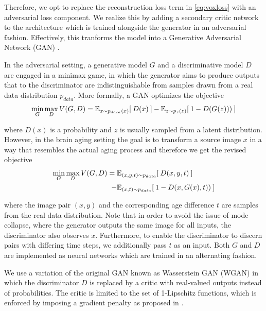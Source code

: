 Therefore, we opt to replace the reconstruction loss term in \autoref{eq:voxloss} with an adversarial loss component. We realize this by adding a secondary critic network to the architecture which is trained alongside the generator in an adversarial fashion. Effectively, this tranforms the model into a Generative Adversarial Network (GAN) \cite{goodfellow2014generative}.

In the adversarial setting, a generative model $G$ and a discriminative model $D$ are engaged in a minimax game, in which the generator aims to produce outputs that to the discriminator are indistinguishable from samples drawn from a real data distribution $p_{data}$. More formally, a GAN optimizes the objective
\begin{equation}
	\min_G \max_D V(G, D) = \mathbb{E}_{ x \sim p_{data}(x) } [ \: D (x) \: ] 
	 - \mathbb{E}_{ z \sim p_z(z) } [ \: 1 - D (G(z))) \: ]
\end{equation}

where $D(x)$ is a probability and $z$ is usually sampled from a latent distribution. However, in the brain aging setting the goal is to transform a source image $x$ in a way that resembles the actual aging process and therefore we get the revised objective
\begin{equation}
	\begin{split}
		\min_G \max_D V(G, D) = \; & \mathbb{E}_{ (x, y, t) \sim p_{data} } [ \: D (x, y, t) \: ] \\
		 - & \mathbb{E}_{ (x, t) \sim p_{data} } [ \: 1 - D (x, G(x), t)) \: ]
	\end{split}
\end{equation}

where the image pair $(x, y)$ and the corresponding age difference $t$ are samples from the real data distribution. Note that in order to avoid the issue of mode collapse, where the generator outputs the same image for all inputs, the discriminator also observes $x$. Furthermore, to enable the discriminator to discern pairs with differing time steps, we additionally pass $t$ as an input. Both $G$ and $D$ are implemented as neural networks which are trained in an alternating fashion. 

We use a variation of the original GAN known as Wasserstein GAN (WGAN) \cite{arjovsky2017wasserstein} in which the discriminator $D$ is replaced by a critic with real-valued outputs instead of probabilities. The critic is limited to the set of 1-Lipschitz functions, which is enforced by imposing a gradient penalty as proposed in \cite{gulrajani2017improved}.

